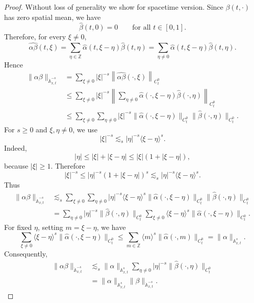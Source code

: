 \documentclass[12pt,reqno,letterpaper]{amsart}
\numberwithin{equation}{section}
\newcommand{\1}{{\bf 1}}
\newcommand{\2}{{\bf 2}}
\theoremstyle{remark}
\theoremstyle{remark}
\begin{document}
\begin{proof}
    Without loss of generality we show for spacetime version.
Since \(\beta(t,\cdot)\) has zero spatial mean, we have
\[
    \widehat\beta(t,0)=0
    \qquad
    \text{for all }t\in[0,1].
\]
Therefore, for every \(\xi\neq0\),
\[
    \widehat{\alpha\beta}(t,\xi)
    =
    \sum_{\eta\in\mathbb Z}
    \widehat\alpha(t,\xi-\eta)\widehat\beta(t,\eta)
    =
    \sum_{\eta\neq0}
    \widehat\alpha(t,\xi-\eta)\widehat\beta(t,\eta).
\]
Hence
\[
\begin{aligned}
\|\alpha\beta\|_{\dot{\mathbb A}_{x,t}^{-s}}
&=
\sum_{\xi\neq0}
|\xi|^{-s}
\left\|
    \widehat{\alpha\beta}(\cdot,\xi)
\right\|_{C_t^0}
\\
&\leq
\sum_{\xi\neq0}
|\xi|^{-s}
\left\|
    \sum_{\eta\neq0}
    \widehat\alpha(\cdot,\xi-\eta)
    \widehat\beta(\cdot,\eta)
\right\|_{C_t^0}
\\
&\leq
\sum_{\xi\neq0}
\sum_{\eta\neq0}
|\xi|^{-s}
\|\widehat\alpha(\cdot,\xi-\eta)\|_{C_t^0}
\|\widehat\beta(\cdot,\eta)\|_{C_t^0}.
\end{aligned}
\]
For \(s\geq0\) and \(\xi,\eta\neq0\), we use
\[
    |\xi|^{-s}
    \lesssim_s
    |\eta|^{-s}
    \langle \xi-\eta\rangle^s.
\]
Indeed,
\[
    |\eta|
    \leq |\xi|+|\xi-\eta|
    \leq |\xi|(1+|\xi-\eta|),
\]
because \(|\xi|\geq1\). Therefore
\[
    |\xi|^{-s}
    \leq
    |\eta|^{-s}(1+|\xi-\eta|)^s
    \lesssim_s
    |\eta|^{-s}\langle \xi-\eta\rangle^s.
\]
Thus
\[
\begin{aligned}
\|\alpha\beta\|_{\dot{\mathbb A}_{x,t}^{-s}}
&\lesssim_s
\sum_{\xi\neq0}
\sum_{\eta\neq0}
|\eta|^{-s}
\langle \xi-\eta\rangle^s
\|\widehat\alpha(\cdot,\xi-\eta)\|_{C_t^0}
\|\widehat\beta(\cdot,\eta)\|_{C_t^0}
\\
&=
\sum_{\eta\neq0}
|\eta|^{-s}
\|\widehat\beta(\cdot,\eta)\|_{C_t^0}
\sum_{\xi\neq0}
\langle \xi-\eta\rangle^s
\|\widehat\alpha(\cdot,\xi-\eta)\|_{C_t^0}.
\end{aligned}
\]
For fixed \(\eta\), setting \(m=\xi-\eta\), we have
\[
    \sum_{\xi\neq0}
    \langle \xi-\eta\rangle^s
    \|\widehat\alpha(\cdot,\xi-\eta)\|_{C_t^0}
    \leq
    \sum_{m\in\mathbb Z}
    \langle m\rangle^s
    \|\widehat\alpha(\cdot,m)\|_{C_t^0}
    =
    \|\alpha\|_{\mathbb A_{x,t}^s}.
\]
Consequently,
\[
\begin{aligned}
\|\alpha\beta\|_{\dot{\mathbb A}_{x,t}^{-s}}
&\lesssim_s
\|\alpha\|_{\mathbb A_{x,t}^s}
\sum_{\eta\neq0}
|\eta|^{-s}
\|\widehat\beta(\cdot,\eta)\|_{C_t^0}
\\
&=
\|\alpha\|_{\mathbb A_{x,t}^s}
\|\beta\|_{\dot{\mathbb A}_{x,t}^{-s}}.
\end{aligned}
\]
\end{proof}
\end{document}
